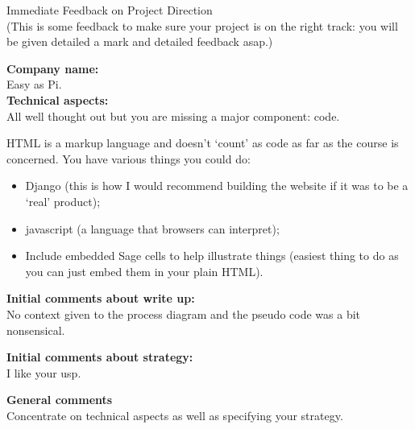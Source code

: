 \documentclass{article}
\begin{document}
\begin{center}
\Huge{Immediate Feedback on Project Direction}\\
\tiny{(This is some feedback to make sure your project is on the right track: you will be given detailed a mark and detailed feedback asap.)}
\end{center}


\normalsize
\textbf{Company name:}\\

Easy as Pi. \\

\textbf{Technical aspects:}\\

All well thought out but you are missing a major component: code.

HTML is a markup language and doesn't `count' as code as far as the course is concerned. You have various things you could do:

\begin{itemize}
    \item Django (this is how I would recommend building the website if it was to be a `real' product);
    \item javascript (a language that browsers can interpret);
    \item Include embedded Sage cells to help illustrate things (easiest thing to do as you can just embed them in your plain HTML).
\end{itemize}

\textbf{Initial comments about write up:}\\

No context given to the process diagram and the pseudo code was a bit nonsensical.

\textbf{Initial comments about strategy:}\\

I like your usp.

\textbf{General comments}\\

Concentrate on technical aspects as well as specifying your strategy.
\end{document}

